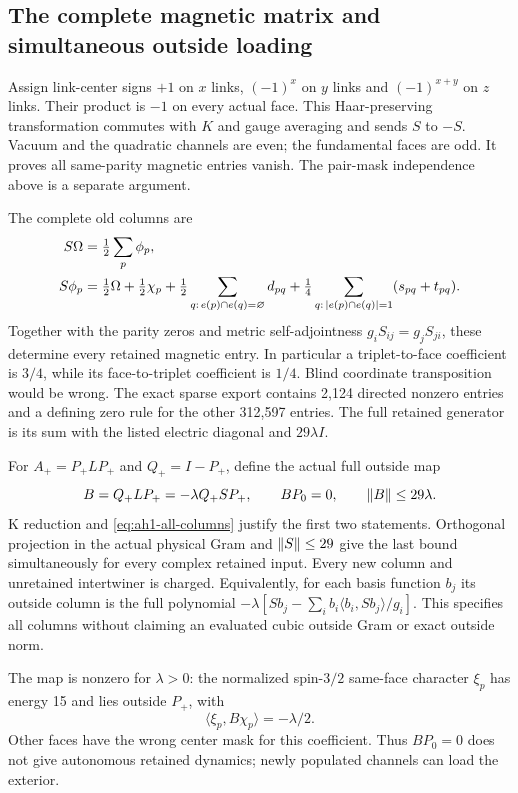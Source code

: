 \subsection{The complete magnetic matrix and simultaneous outside loading}
Assign link-center signs $+1$ on $x$ links, $(-1)^x$ on $y$ links and $(-1)^{x+y}$ on $z$ links. Their product is $-1$ on every actual face. This Haar-preserving transformation commutes with $K$ and gauge averaging and sends $S$ to $-S$. Vacuum and the quadratic channels are even; the fundamental faces are odd. It proves all same-parity magnetic entries vanish. The pair-mask independence above is a separate argument.

The complete old columns are
\begin{align}
 S\Omega&=\tfrac12\sum_p\phi_p,\notag\\
 S\phi_p&=\tfrac12\Omega+\tfrac12\chi_p
 +\tfrac12\sum_{q:\,e(p)\cap e(q)=\varnothing}d_{pq}
 +\tfrac14\sum_{q:\,|e(p)\cap e(q)|=1}(s_{pq}+t_{pq}).
 \label{eq:ah1-all-columns}
\end{align}
Together with the parity zeros and metric self-adjointness $g_iS_{ij}=g_jS_{ji}$, these determine every retained magnetic entry. In particular a triplet-to-face coefficient is $3/4$, while its face-to-triplet coefficient is $1/4$. Blind coordinate transposition would be wrong. The exact sparse export contains 2,124 directed nonzero entries and a defining zero rule for the other 312,597 entries. The full retained generator is its sum with the listed electric diagonal and $29\lambda I$.

For $A_+=P_+LP_+$ and $Q_+=I-P_+$, define the actual full outside map
\begin{equation}
 B=Q_+LP_+=-\lambda Q_+SP_+,
 \qquad BP_0=0,
 \qquad\left\lVert B\right\rVert\le29\lambda.
 \label{eq:ah1-outside}
\end{equation}
K reduction and \eqref{eq:ah1-all-columns} justify the first two statements. Orthogonal projection in the actual physical Gram and $\left\lVert S\right\rVert\le29$ give the last bound simultaneously for every complex retained input. Every new column and unretained intertwiner is charged. Equivalently, for each basis function $b_j$ its outside column is the full polynomial
$-\lambda[Sb_j-\sum_i b_i\langle b_i,Sb_j\rangle/g_i]$.
This specifies all columns without claiming an evaluated cubic outside Gram or exact outside norm.

The map is nonzero for $\lambda>0$: the normalized spin-$3/2$ same-face character $\xi_p$ has energy 15 and lies outside $P_+$, with
\begin{equation}
 \langle\xi_p,B\chi_p\rangle=-\lambda/2.
\end{equation}
Other faces have the wrong center mask for this coefficient. Thus $BP_0=0$ does not give autonomous retained dynamics; newly populated channels can load the exterior.

